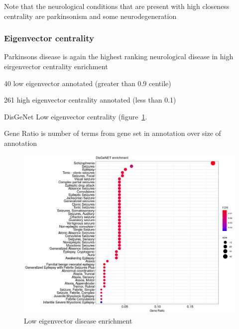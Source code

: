 Note that the neurological conditions that are present with high closeness centrality are parkinsonism and some neurodegeneration


\subsubsection{Eigenvector centrality}

Parkinsons disease is again the highest ranking neurological disease in high eirgenvector centrality enrichment

40 low eigenvector annotated (greater than 0.9 centile)

261 high eigenvector centrality annotated (less than 0.1)


DisGeNet Low eigenvector centrality (figure~\ref{fig:low eigenvector disease enrichment cut off 0.05}.

Gene Ratio is number of terms from gene set in annotation over size of annotation

\begin{figure}
    \centering
    \includegraphics[width=\textwidth]{images/Rplot_low_eigenvector_centrality.png}
    \caption{Low eigenvector disease enrichment}
    \label{fig:low eigenvector disease enrichment cut off 0.05}
\end{figure}


